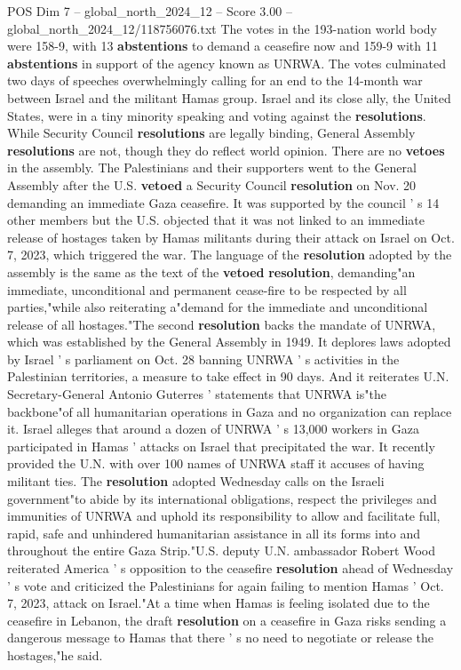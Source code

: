 \begin{textsample}{POS Dim 7 – global\_north\_2024\_12 – Score 3.00 – global\_north\_2024\_12/118756076.txt}  \label{ex:f7_pos_295}
The votes in the 193-nation world body were 158-9, with 13 \textbf{abstentions} to demand a ceasefire now and 159-9 with 11 \textbf{abstentions} in support of the agency known as UNRWA.
The votes culminated two days of speeches overwhelmingly calling for an end to the 14-month war between Israel and the militant Hamas group.
Israel and its close ally, the United States, were in a tiny minority speaking and voting against the \textbf{resolutions}.
While Security Council \textbf{resolutions} are legally binding, General Assembly \textbf{resolutions} are not, though they do reflect world opinion.
There are no \textbf{vetoes} in the assembly.
The Palestinians and their supporters went to the General Assembly after the U.S. \textbf{vetoed} a Security Council \textbf{resolution} on Nov. 20 demanding an immediate Gaza ceasefire.
It was supported by the council ' s 14 other members but the U.S. objected that it was not linked to an immediate release of hostages taken by Hamas militants during their attack on Israel on Oct. 7, 2023, which triggered the war.
The language of the \textbf{resolution} adopted by the assembly is the same as the text of the \textbf{vetoed} \textbf{resolution}, demanding"an immediate, unconditional and permanent cease-fire to be respected by all parties,"while also reiterating a"demand for the immediate and unconditional release of all hostages."The second \textbf{resolution} backs the mandate of UNRWA, which was established by the General Assembly in 1949.
It deplores laws adopted by Israel ' s parliament on Oct. 28 banning UNRWA ' s activities in the Palestinian territories, a measure to take effect in 90 days.
And it reiterates U.N.
Secretary-General Antonio Guterres ' statements that UNRWA is"the backbone"of all humanitarian operations in Gaza and no organization can replace it.
Israel alleges that around a dozen of UNRWA ' s 13,000 workers in Gaza participated in Hamas ' attacks on Israel that precipitated the war.
It recently provided the U.N. with over 100 names of UNRWA staff it accuses of having militant ties.
The \textbf{resolution} adopted Wednesday calls on the Israeli government"to abide by its international obligations, respect the privileges and immunities of UNRWA and uphold its responsibility to allow and facilitate full, rapid, safe and unhindered humanitarian assistance in all its forms into and throughout the entire Gaza Strip."U.S. deputy U.N. ambassador Robert Wood reiterated America ' s opposition to the ceasefire \textbf{resolution} ahead of Wednesday ' s vote and criticized the Palestinians for again failing to mention Hamas ' Oct. 7, 2023, attack on Israel."At a time when Hamas is feeling isolated due to the ceasefire in Lebanon, the draft \textbf{resolution} on a ceasefire in Gaza risks sending a dangerous message to Hamas that there ' s no need to negotiate or release the hostages,"he said.

\end{textsample}
